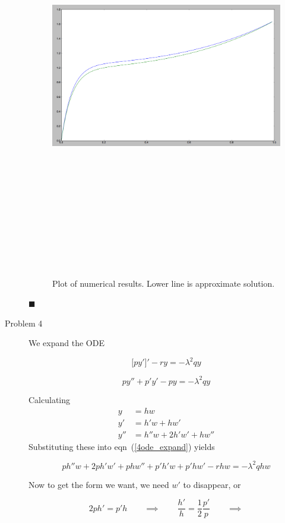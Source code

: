 \documentclass[11pt]{article}
\newcommand{\eq}[1]{\begin{align*}#1\end{align*}}
\newcommand{\eqn}[2]{
  \begin{equation}
    \label{#1}
    #2
  \end{equation}
}
\newcommand{\lam}{\lambda}
\newcommand{\eqr}[1]{eqn~(\ref{#1})}
\begin{document}
\begin{description}
\begin{figure}[H]
\begin{center}
\includegraphics[angle=90,height=7in]{plot.png}
\caption{Plot of numerical results. Lower line is approximate solution.}
\end{center}
\end{figure}
\hfill $\blacksquare$
\item[Problem 4] We expand the ODE
\eqn{4ode}{
  \big[
  py'
  \big]'
  - ry
  =
  -\lam^2qy
}
\eqn{4ode_expand}{
  py'' + p'y' - py = -\lam^2 qy
}
Calculating
\eq{
  y &= hw\\
  y' &= h'w + hw'\\
  y'' &= h''w + 2 h'w' + hw''
}
Substituting these into \eqr{4ode_expand} yields
\eqn{4ode_subs}{
  ph''w + 2ph'w' + phw'' + p'h'w + p'hw' - rhw = -\lam^2qhw
}
Now to get the form we want, we need $w'$ to disappear, or
\eqn{4h_cond}{
  2ph' = p'h
  \qquad
  \implies
  \qquad
  \frac{h'}{h} = \frac{1}{2}\frac{p'}{p}
  \qquad
  \implies
}
\end{description}
\end{document}
